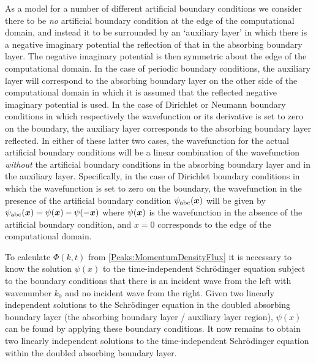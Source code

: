 As a model for a number of different artificial boundary conditions we consider there to be \emph{no} artificial boundary condition at the edge of the computational domain, and instead it to be surrounded by an `auxiliary layer' in which there is a negative imaginary potential the reflection of that in the absorbing boundary layer. The negative imaginary potential is then symmetric about the edge of the computational domain. In the case of periodic boundary conditions, the auxiliary layer will correspond to the absorbing boundary layer on the other side of the computational domain in which it is assumed that the reflected negative imaginary potential is used. In the case of Dirichlet or Neumann boundary conditions in which respectively the wavefunction or its derivative is set to zero on the boundary, the auxiliary layer corresponds to the absorbing boundary layer reflected. In either of these latter two cases, the wavefunction for the actual artificial boundary conditions will be a linear combination of the wavefunction \emph{without} the artificial boundary conditions in the absorbing boundary layer and in the auxiliary layer. Specifically, in the case of Dirichlet boundary conditions in which the wavefunction is set to zero on the boundary, the wavefunction in the presence of the artificial boundary condition $\psi_\text{abc}(\bm{x})$ will be given by $\psi_\text{abc}(\bm{x}) = \psi(\bm{x}) - \psi(-\bm{x})$ where $\psi(\bm{x})$ is the wavefunction in the absence of the artificial boundary condition, and $x=0$ corresponds to the edge of the computational domain.

To calculate $\Phi(k, t)$ from \eqref{Peaks:MomentumDensityFlux} it is necessary to know the solution $\psi(x)$ to the time-independent Schrödinger equation subject to the boundary conditions that there is an incident wave from the left with wavenumber $k_0$ and no incident wave from the right. Given two linearly independent solutions to the Schrödinger equation in the doubled absorbing boundary layer (the absorbing boundary layer / auxiliary layer region), $\psi(x)$ can be found by applying these boundary conditions. It now remains to obtain two linearly independent solutions to the time-independent Schrödinger equation within the doubled absorbing boundary layer.

